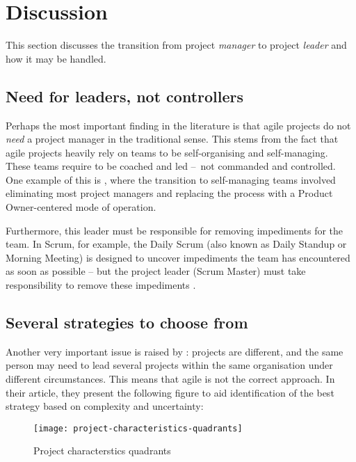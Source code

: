 \section{Discussion}

This section discusses the transition from project \emph{manager} to project \emph{leader} and how it may be handled.

\subsection{Need for leaders, not controllers}

Perhaps the most important finding in the literature is that agile projects do not \emph{need} a project manager in the traditional sense. This stems from the fact that agile projects heavily rely on teams to be self-organising and self-managing. These teams require to be coached and led – not commanded and controlled. One example of this is \autocite{yi:managerasscrummaster}, where the transition to self-managing teams involved eliminating most project managers and replacing the process with a Product Owner-centered mode of operation.

Furthermore, this leader must be responsible for removing impediments for the team. In Scrum, for example, the Daily Scrum (also known as Daily Standup or Morning Meeting) is designed to uncover impediments the team has encountered as soon as possible – but the project leader (Scrum Master) must take responsibility to remove these impediments \autocite{schwaber:scrum}.

\subsection{Several strategies to choose from}

Another very important issue is raised by \autocite{fernandez:agilevstraditional}: projects are different, and the same person may need to lead several projects within the same organisation under different circumstances. This means that agile is not the correct approach. In their article, they present the following figure to aid identification of the best strategy based on complexity and uncertainty:

\begin{figure}[H]
    \label{fig:projectcharacteristicsquadrants}
    \centerline{\texttt{[image: project-characteristics-quadrants]}}
    \caption{Project characterstics quadrants}
\end{figure}


